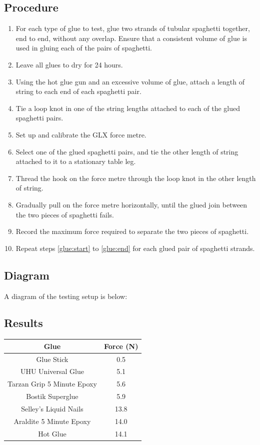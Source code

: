 \documentclass[a4paper,11pt]{article}
\begin{document}
\subsection{Procedure}

\begin{enumerate}
\item For each type of glue to test, glue two strands of tubular spaghetti
	together, end to end, without any overlap. Ensure that a consistent volume
	of glue is used in gluing each of the pairs of spaghetti.
\item Leave all glues to dry for 24 hours.
\item Using the hot glue gun and an excessive volume of glue, attach a length of
	string to each end of each spaghetti pair.
\item Tie a loop knot in one of the string lengths attached to each of the glued
	spaghetti pairs.
\item Set up and calibrate the GLX force metre.
\item \label{glue:start} Select one of the glued spaghetti pairs, and tie the
	other length of string attached to it to a stationary table leg.
\item Thread the hook on the force metre through the loop knot in the other
	length of string.
\item Gradually pull on the force metre horizontally, until the glued join
	between the two pieces of spaghetti fails.
\item \label{glue:end} Record the maximum force required to separate the two
	pieces of spaghetti.
\item Repeat steps \ref{glue:start} to \ref{glue:end} for each glued pair of
	spaghetti strands.
\end{enumerate}


\subsection{Diagram}

A diagram of the testing setup is below:

\vspace{5cm}


\subsection{Results}

\begin{center}
\begin{tabular}{|c|c|}
\hline
Glue & Force (N) \\
\hline
Glue Stick                 & 0.5  \\
UHU Universal Glue         & 5.1  \\
Tarzan Grip 5 Minute Epoxy & 5.6  \\
Bostik Superglue           & 5.9  \\
Selley's Liquid Nails      & 13.8 \\
Araldite 5 Minute Epoxy    & 14.0 \\
Hot Glue                   & 14.1 \\
\hline
\end{tabular}
\end{center}
\end{document}
